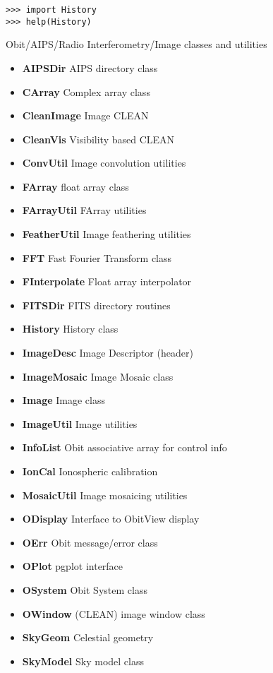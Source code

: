 \documentclass[11pt]{report}
\begin{document}
\begin{verbatim}
>>> import History
>>> help(History)
\end{verbatim}

Obit/AIPS/Radio Interferometry/Image classes and utilities
\begin{itemize}
\item {\bf AIPSDir}        AIPS directory class
\item {\bf CArray}         Complex array class
\item {\bf CleanImage}     Image CLEAN
\item {\bf CleanVis}       Visibility based CLEAN
\item {\bf ConvUtil}       Image convolution utilities
\item {\bf FArray}         float array class
\item {\bf FArrayUtil}     FArray utilities
\item {\bf FeatherUtil}    Image feathering utilities
\item {\bf FFT}            Fast Fourier Transform class
\item {\bf FInterpolate}   Float array interpolator
\item {\bf FITSDir}        FITS directory routines
\item {\bf History}        History class
\item {\bf ImageDesc}      Image Descriptor (header)
\item {\bf ImageMosaic}    Image Mosaic class
\item {\bf Image}          Image class
\item {\bf ImageUtil}      Image utilities
\item {\bf InfoList}       Obit associative array for control info
\item {\bf IonCal}         Ionospheric calibration
\item {\bf MosaicUtil}     Image mosaicing utilities
\item {\bf ODisplay }      Interface to ObitView display
\item {\bf OErr}           Obit message/error class
\item {\bf OPlot}          pgplot interface
\item {\bf OSystem }       Obit System class
\item {\bf OWindow}        (CLEAN) image window class
\item {\bf SkyGeom}        Celestial geometry
\item {\bf SkyModel}       Sky model class

\end{itemize}
\end{document}
